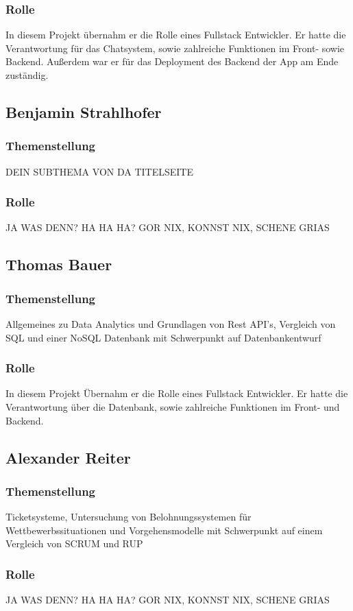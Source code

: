 \subsubsection{Rolle}
In diesem Projekt übernahm er die Rolle eines Fullstack Entwickler. Er hatte die Verantwortung für das Chatsystem,
sowie zahlreiche Funktionen im Front- sowie Backend. Außerdem war er für das Deployment des Backend der App am Ende zuständig.

\subsection{Benjamin Strahlhofer}
\subsubsection{Themenstellung}
DEIN SUBTHEMA VON DA TITELSEITE
\subsubsection{Rolle}
JA WAS DENN? HA HA HA? GOR NIX, KONNST NIX, SCHENE GRIAS

\subsection{Thomas Bauer}
\subsubsection{Themenstellung}
Allgemeines zu Data Analytics und Grundlagen von Rest API's, Vergleich von SQL und einer NoSQL Datenbank mit Schwerpunkt auf Datenbankentwurf
\subsubsection{Rolle}
In diesem Projekt Übernahm er die Rolle eines Fullstack Entwickler. Er hatte die Verantwortung über die Datenbank, 
sowie zahlreiche Funktionen im Front- und Backend. 

\subsection{Alexander Reiter}
\subsubsection{Themenstellung}
Ticketsysteme, Untersuchung von Belohnungssystemen für Wettbewerbssituationen und Vorgehensmodelle mit Schwerpunkt auf einem Vergleich von SCRUM und RUP
\subsubsection{Rolle}
JA WAS DENN? HA HA HA? GOR NIX, KONNST NIX, SCHENE GRIAS

\newpage